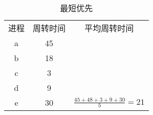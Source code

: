 \documentclass[UTF8]{ctexart}
\begin{document}
    \begin{table}[htb]
        \begin{center}
        \caption{最短优先}
            \begin{tabular}{ccc}
                \hline
                进程&周转时间&平均周转时间\\
                a&45\\
                b&18\\
                c&3\\
                d&9\\
                e&30&$\frac{45+48+3+9+30}{5} = 21$\\
                \hline
            \end{tabular}
        \end{center}
    \end{table}
\end{document}
